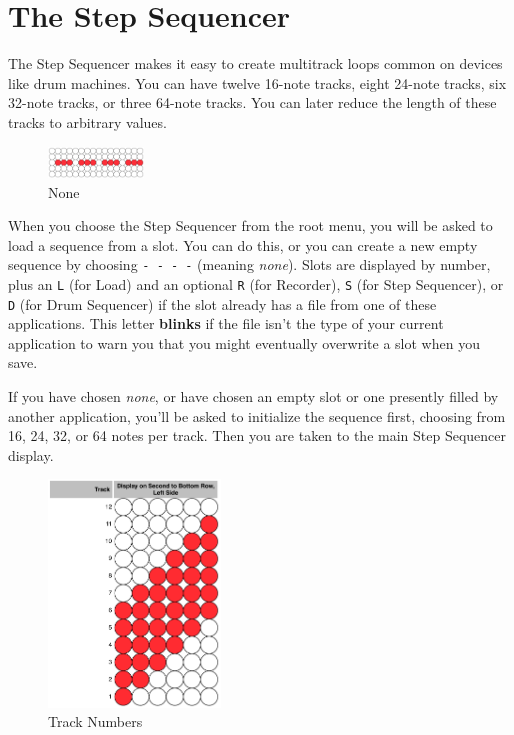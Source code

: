 \documentclass{article}
\begin{document}
\section {The Step Sequencer}
\label{stepsequencersec}

The Step Sequencer makes it easy to create multitrack loops common on devices like drum machines.  You can have twelve 16-note tracks, eight 24-note tracks, six 32-note tracks, or three 64-note tracks.  You can later reduce the length of these tracks to arbitrary values.

\begin{figure}
\vspace{-1em}\includegraphics[width=1in]{none.pdf}
\vspace{-2em}\caption{\small None}\vspace{-1em}
\label{none}
\end{figure}

When you choose the Step Sequencer from the root menu, you will be asked to load a sequence from a slot.  You can do this, or you can create a new empty sequence by choosing \texttt{-~-~-~-} (meaning {\it none}).  Slots are displayed by number, plus an \texttt{L} (for Load) and an optional \texttt{R} (for Recorder), \texttt{S} (for Step Sequencer), or \texttt{D} (for Drum Sequencer) if the slot already has a file from one of these applications.  This letter {\bf blinks} if the file isn't the type of your current application to warn you that you might eventually overwrite a slot when you save.

If you have chosen {\it none}, or have chosen an empty slot or one presently filled by another application, you'll be asked to initialize the sequence first, choosing from 16, 24, 32, or 64 notes per track. Then you are taken to the main Step Sequencer display.  

\begin{figure}
\includegraphics[width=1.8in]{track.pdf}
\vspace{-2em}\caption{\small Track Numbers}
\label{tracknumber}
\end{figure}
\end{document}

